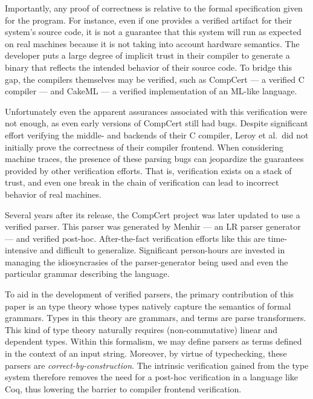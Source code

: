 \documentclass[acmsmall,screen,nonacm]{acmart}
\begin{document}
Importantly, any proof of correctness is relative to the formal specification given
for the program. For instance, even if one provides a verified artifact for
their system's source code, it is not a guarantee that this system will run as
expected on real machines because it is not taking into account hardware
semantics.
The developer puts a large degree of implicit trust in
their compiler to generate a binary that reflects the intended behavior of their
source code. To bridge this gap, the compilers themselves may be verified, such
as CompCert\cite{leroy_formal_2009} --- a verified C compiler ---
and CakeML\cite{kumar_cakeml_2014} --- a verified implementation of an ML-like language.

Unfortunately even the apparent assurances associated with
this verification were not enough, as even early versions of CompCert still
had bugs\cite{yangFindingUnderstandingBugs}. Despite significant effort
verifying the middle- and backends of their C compiler, Leroy et al.\ did not
initially prove the correctness of their compiler frontend. When considering
machine traces, the presence of
these parsing bugs can jeopardize the guarantees provided by other verification
efforts. That is, verification exists on a stack of trust, and even one break in
the chain of verification can lead to incorrect behavior of real machines.

Several years after its release, the CompCert project was later updated to use a
verified parser\cite{jourdanValidatingLRParsers2012}. This parser was generated
by Menhir --- an LR parser generator --- and verified
post-hoc. After-the-fact
verification efforts like this are
time-intensive and difficult to generalize. Significant person-hours are
invested in managing the idiosyncrasies of the parser-generator being used and
even the particular grammar describing the
language.

To aid in the development of verified parsers, the primary contribution
of this paper is
an type
theory whose types natively capture the semantics of formal
grammars. Types in this theory are grammars, and terms are
parse transformers. This kind of type theory naturally
requires (non-commutative) linear and dependent types.
Within this formalism, we may define parsers as terms
defined in the context of an input string. Moreover, by virtue of
typechecking, these parsers are \emph{correct-by-construction}. The intrinsic
verification gained from the type system therefore removes the need for a
post-hoc verification in a language like Coq, thus lowering the barrier to
compiler frontend verification.
\end{document}
